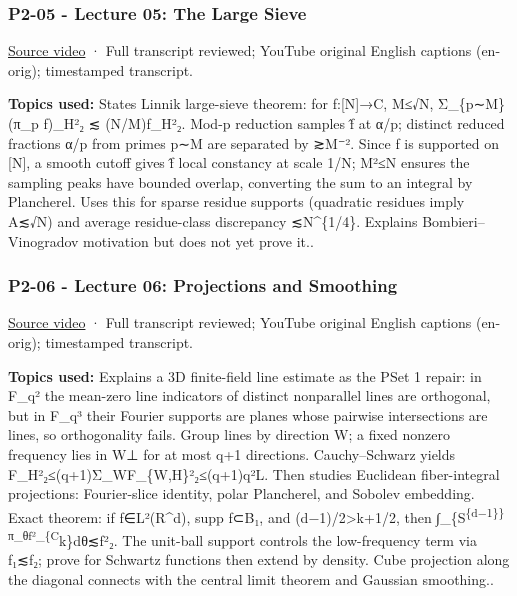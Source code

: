 \subsubsection{P2-05 - Lecture 05: The Large Sieve}\label{04-visual-computing-ii-ch036-p2-05---lecture-05-the-large-sieve}

\href{https://www.youtube.com/watch?v=i5lpHaGpeaI}{Source video} · Full transcript reviewed; YouTube original English captions (en-orig); timestamped transcript.

\textbf{Topics used:} States Linnik large-sieve theorem: for f:{[}N{]}→C, M≤√N, Σ\_\{p∼M\}\textbar\textbar(π\_p f)\_H\textbar\textbar²₂ ≲ (N/M)\textbar\textbar f\_H\textbar\textbar²₂. Mod-p reduction samples f̂ at α/p; distinct reduced fractions α/p from primes p∼M are separated by ≳M⁻². Since f is supported on {[}N{]}, a smooth cutoff gives f̂ local constancy at scale 1/N; M²≤N ensures the sampling peaks have bounded overlap, converting the sum to an integral by Plancherel. Uses this for sparse residue supports (quadratic residues imply \textbar A\textbar≲√N) and average residue-class discrepancy ≲N\^{}\{1/4\}. Explains Bombieri--Vinogradov motivation but does not yet prove it..

\subsubsection{P2-06 - Lecture 06: Projections and Smoothing}\label{04-visual-computing-ii-ch036-p2-06---lecture-06-projections-and-smoothing}

\href{https://www.youtube.com/watch?v=iUB_y1OXBo4}{Source video} · Full transcript reviewed; YouTube original English captions (en-orig); timestamped transcript.

\textbf{Topics used:} Explains a 3D finite-field line estimate as the PSet 1 repair: in F\_q² the mean-zero line indicators of distinct nonparallel lines are orthogonal, but in F\_q³ their Fourier supports are planes whose pairwise intersections are lines, so orthogonality fails. Group lines by direction W; a fixed nonzero frequency lies in W⊥ for at most q+1 directions. Cauchy--Schwarz yields \textbar\textbar F\_H\textbar\textbar²₂≤(q+1)Σ\_W\textbar\textbar F\_\{W,H\}\textbar\textbar²₂≤(q+1)q²\textbar L\textbar. Then studies Euclidean fiber-integral projections: Fourier-slice identity, polar Plancherel, and Sobolev embedding. Exact theorem: if f∈L²(R\^{}d), supp f⊂B₁, and (d−1)/2\textgreater k+1/2, then ∫\_\{S\textsuperscript{\{d−1\}\}\textbar\textbar π\_θf\textbar\textbar²\_\{C}k\}dθ≲\textbar\textbar f\textbar\textbar²₂. The unit-ball support controls the low-frequency term via \textbar\textbar f\textbar\textbar₁≲\textbar\textbar f\textbar\textbar₂; prove for Schwartz functions then extend by density. Cube projection along the diagonal connects with the central limit theorem and Gaussian smoothing..

